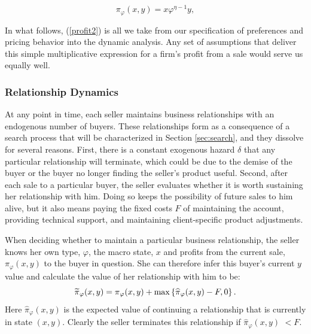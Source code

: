 \documentclass[12pt,titlepage]{article}
\begin{document}
\begin{equation}
\pi _{\varphi }(x,y)=x\varphi ^{\eta -1}y,  \label{profit2}
\end{equation}
\qquad \qquad

In what follows, (\ref{profit2}) is all we take from our specification of
preferences and pricing behavior into the dynamic analysis. Any set of
assumptions that deliver this simple multiplicative expression for a firm's
profit from a sale would serve us equally well.

\subsubsection{Relationship Dynamics}

At any point in time, each seller maintains business relationships with an
endogenous number of buyers. These relationships form as a consequence of a
search process that will be characterized in Section \ref{sec:search}, and they
dissolve for several reasons. First, there is a constant exogenous hazard $%
\delta $ that any particular relationship will terminate, which could be due
to the demise of the buyer or the buyer no longer finding the seller's
product useful. Second, after each sale to a particular buyer, the seller
evaluates whether it is worth sustaining her relationship with him. Doing so
keeps the possibility of future sales to him alive, but it also means paying
the fixed costs $F$ of maintaining the account, providing technical support,
and maintaining client-specific product adjustments.\footnotemark{}

When deciding whether to maintain a particular business relationship, the
seller knows her own type, $\varphi $, the macro state, $x$ and profits from
the current sale, $\pi _{\varphi }(x,y)$ to the buyer in question. She can
therefore infer this buyer's current $y$ value and calculate the value of
her relationship with him to be:%
\begin{equation*}
\widetilde{\pi }_{\varphi }(x,y)=\pi _{\varphi }(x,y)+\max \left\{ \widehat{%
\pi }_{\varphi }(x,y)-F,0\right\} .
\end{equation*}%
Here $\widehat{\pi }_{\varphi }(x,y)$ is the expected value of continuing a
relationship that is currently in state $(x,y).$ Clearly the seller
terminates this relationship if $\widehat{\pi }_{\varphi }(x,y)$ $<F.$
\end{document}
